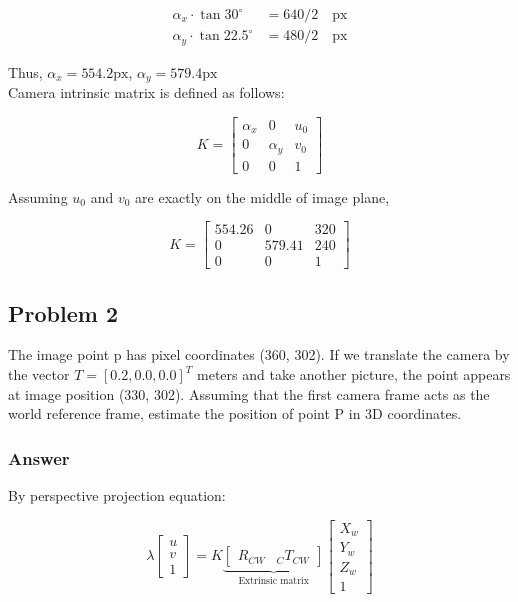 \documentclass[12pt]{article}
\begin{document}
\begin{align}
	\alpha_x \cdot \tan 30 ^\circ &= 640 / 2 \quad \text{px} \\
	\alpha_y \cdot \tan 22.5 ^\circ &= 480 / 2 \quad \text{px}
\end{align}

\noindent Thus, $\alpha_x = 554.2 \text{px}$, $\alpha_y = 579.4 \text{px}$ \\

\noindent Camera intrinsic matrix is defined as follows:

\begin{equation}
	K = 
	\begin{bmatrix}
		\alpha_x 	& 0			& u_0 \\
		0			& \alpha_y 	& v_0 \\
		0			& 0			& 1
	\end{bmatrix}
\end{equation}

\noindent Assuming $u_0$ and $v_0$ are exactly on the middle of image plane, 

\begin{equation}
	K = 
	\begin{bmatrix}
		554.26 		& 0			& 320 \\
		0			& 579.41 	& 240 \\
		0			& 0			& 1
	\end{bmatrix}
\end{equation}

\subsection*{Problem 2}

The image point p has pixel coordinates (360, 302). If we translate the camera by the vector $T=[0.2,0.0,0.0]^T$ meters and take another picture, the point appears at image position (330, 302). Assuming that the first camera frame acts as the world reference frame, estimate the position of point P in 3D coordinates.

\subsubsection*{Answer}

By perspective projection equation:

\begin{equation}
	\lambda 
	\begin{bmatrix}
		u \\
		v \\
		1
	\end{bmatrix}
	= K
	\underbrace{
		\begin{bmatrix}
			R_{CW} & {}_{C}T_{CW}
		\end{bmatrix}
	}_\text{Extrinsic matrix}
	\begin{bmatrix}
		X_w \\
		Y_w \\
		Z_w \\
		1
	\end{bmatrix}
\end{equation}
\end{document}
